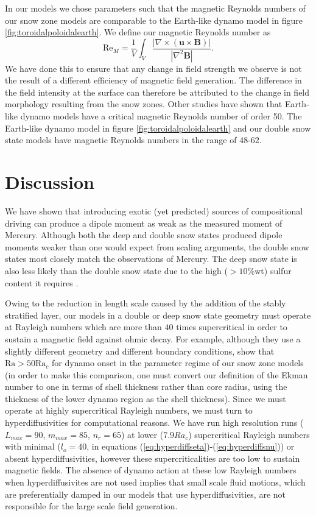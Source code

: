 In our models we chose parameters such that the magnetic Reynolds numbers of our snow zone models are comparable to the Earth-like dynamo model in figure \ref{fig:toroidalpoloidalearth}. We define our magnetic Reynolds number as
\begin{equation}
\mathrm{Re}_{M}=\frac{1}{V}\int_{V}\frac{\left|\nabla\times\left(\mathbf{u}\times\mathbf{B}\right)\right|}{\left|\nabla^{2}\mathbf{B}\right|}.
\end{equation}
We have done this to ensure that any change in field strength we observe is not the result of a different efficiency of magnetic field generation. The difference in the field intensity at the surface can therefore be attributed to the change in field morphology resulting from the snow zones. Other studies  \citep{christensen06scaling} have shown that Earth-like dynamo models have a critical magnetic Reynolds number of order 50. The Earth-like dynamo model in figure \ref{fig:toroidalpoloidalearth} and our double snow state models have magnetic Reynolds numbers in the range of $48$-$62$.

\section{Discussion}
We have shown that introducing exotic (yet predicted) sources of compositional driving can produce a dipole moment as weak as the measured moment of Mercury. Although both the deep and double snow states produced dipole moments weaker than one would expect from scaling arguments, the double snow states most closely match the observations of Mercury. The deep snow state is also less likely than the double snow state due to the high ($>10\%$wt) sulfur content it requires \citep{rivoldini09}. 

Owing to the reduction in length scale caused by the addition of the stably stratified layer, our models in a double or deep snow state geometry must operate at Rayleigh numbers which are more than $40$ times supercritical in order to sustain a magnetic field against ohmic decay. For example, although they use a slightly different geometry and different boundary conditions, \citet{christensen06} show that $\mathrm{Ra}>50\mathrm{Ra}_{c}$ for dynamo onset in the parameter regime of our snow zone models (in order to make this comparison, one must convert our definition of the Ekman number to one in terms of shell thickness rather than core radius, using the thickness of the lower dynamo region as the shell thickness). Since we must operate at highly supercritical Rayleigh numbers, we must turn to hyperdiffusivities for computational reasons. We have run high resolution runs  ($L_{max}=90$, $m_{max}=85$, $n_{r}=65$) at lower ($7.9 Ra_{c}$) supercritical Rayleigh numbers with minimal ($l_{o}=40$, in equations (\ref{eq:hyperdiffseta})-(\ref{eq:hyperdiffsnu})) or absent hyperdiffusivities, however these supercriticalities are too low to sustain magnetic fields. The absence of dynamo action at these low Rayleigh numbers when hyperdiffusivites are not used implies that small scale fluid motions, which are preferentially damped in our models that use hyperdiffusivities, are not responsible for the large scale field generation.

